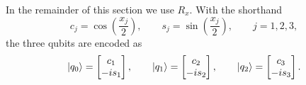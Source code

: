 \documentclass[12pt]{article}
\numberwithin{equation}{section}  %
\begin{document}
In the remainder of this section we use $R_x$. With the shorthand
\begin{equation}
c_j = \cos\!\left(\frac{x_j}{2}\right), \qquad s_j = \sin\!\left(\frac{x_j}{2}\right), \qquad j = 1, 2, 3,
\end{equation}
the three qubits are encoded as
\begin{equation}
\ket{q_0} = \begin{bmatrix} c_1 \\ -is_1 \end{bmatrix}, \qquad
\ket{q_1} = \begin{bmatrix} c_2 \\ -is_2 \end{bmatrix}, \qquad
\ket{q_2} = \begin{bmatrix} c_3 \\ -is_3 \end{bmatrix}.
\end{equation}
\end{document}

